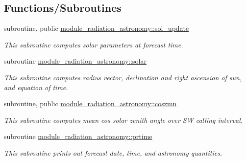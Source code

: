 \subsection*{Functions/\+Subroutines}
\begin{DoxyCompactItemize}
\item 
subroutine, public \hyperlink{group__module__radiation__astronomy_gaf1997565a45e04ac5261be36708384cf}{module\+\_\+radiation\+\_\+astronomy\+::sol\+\_\+update}
\begin{DoxyCompactList}\small\item\em This subroutine computes solar parameters at forecast time. \end{DoxyCompactList}\item 
subroutine \hyperlink{group__module__radiation__astronomy_gab295ff320cb8720fde46e80ee6573f08}{module\+\_\+radiation\+\_\+astronomy\+::solar}
\begin{DoxyCompactList}\small\item\em This subroutine computes radius vector, declination and right ascension of sun, and equation of time. \end{DoxyCompactList}\item 
subroutine, public \hyperlink{group__module__radiation__astronomy_gae8382ae3394204b9b4c30fe6210a2f9d}{module\+\_\+radiation\+\_\+astronomy\+::coszmn}
\begin{DoxyCompactList}\small\item\em This subroutine computes mean cos solar zenith angle over SW calling interval. \end{DoxyCompactList}\item 
subroutine \hyperlink{group__module__radiation__astronomy_ga44ddc71547a446b199afaa05dc9dd868}{module\+\_\+radiation\+\_\+astronomy\+::prtime}
\begin{DoxyCompactList}\small\item\em This subroutine prints out forecast date, time, and astronomy quantities. \end{DoxyCompactList}\end{DoxyCompactItemize}
